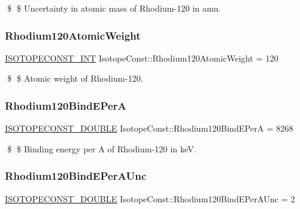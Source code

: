 \$ \$ Uncertainty in atomic mass of Rhodium-\/120 in amu. \mbox{\label{group___isotope_const-_rhodium-_rh120_ga7951dabf16cfcb8ceae2fe7a083d39cc}} 
\subsubsection{\texorpdfstring{Rhodium120\+Atomic\+Weight}{Rhodium120AtomicWeight}}
{\footnotesize\ttfamily \mbox{\hyperlink{group___isotope_const-_macros_ga5f18360b3e99483a35c32d789e62621c}{I\+S\+O\+T\+O\+P\+E\+C\+O\+N\+S\+T\+\_\+\+I\+NT}} Isotope\+Const\+::\+Rhodium120\+Atomic\+Weight = 120}

\$ \$ Atomic weight of Rhodium-\/120. \mbox{\label{group___isotope_const-_rhodium-_rh120_ga28e9f7fb510f004e4a617b27a2c7a9b7}} 
\subsubsection{\texorpdfstring{Rhodium120\+Bind\+E\+PerA}{Rhodium120BindEPerA}}
{\footnotesize\ttfamily \mbox{\hyperlink{group___isotope_const-_macros_ga8f45a7272ce02c0b4c65c44636ed719a}{I\+S\+O\+T\+O\+P\+E\+C\+O\+N\+S\+T\+\_\+\+D\+O\+U\+B\+LE}} Isotope\+Const\+::\+Rhodium120\+Bind\+E\+PerA = 8268}

\$ \$ Binding energy per A of Rhodium-\/120 in keV. \mbox{\label{group___isotope_const-_rhodium-_rh120_ga69ff83e2add6e0c719d2bf64a7590475}} 
\subsubsection{\texorpdfstring{Rhodium120\+Bind\+E\+Per\+A\+Unc}{Rhodium120BindEPerAUnc}}
{\footnotesize\ttfamily \mbox{\hyperlink{group___isotope_const-_macros_ga8f45a7272ce02c0b4c65c44636ed719a}{I\+S\+O\+T\+O\+P\+E\+C\+O\+N\+S\+T\+\_\+\+D\+O\+U\+B\+LE}} Isotope\+Const\+::\+Rhodium120\+Bind\+E\+Per\+A\+Unc = 2}


